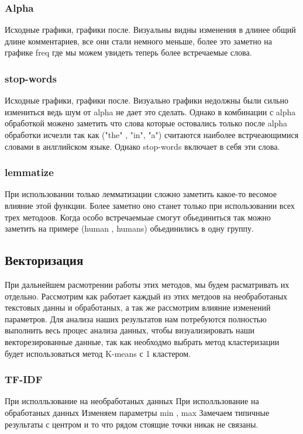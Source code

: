 		\subsubsection{Alpha}
			Исходные графики, графики после. Визуальны видны изменения в длинее общий длине комментариев, все они стали немного меньше, более это заметно на графике freq где мы можем увидеть теперь более встречаемые слова. 
				
				
		\subsubsection{stop-words}
			Исходные графики, графики после. Визуально графики недолжны были сильно измениться ведь шум от alpha не дает это сделать. Однако в комбинации с alpha обработкой можено заметить что слова которые остовались только после alpha обработки исчезли так как ("the" , "in", "a") считаются наиболее встрчеающимися словами в анлглийском языке. Однако stop-words включает в себя эти слова.
			
		\subsubsection{lemmatize}
			При использовании только лемматизации сложно заметить какое-то весомое влияние этой функции.
			Более заметно оно станет только при использовании всех трех методоов. Когда особо встречаемыае смогут обьединиться так можно заметить на примере (human , humans) обьединились в одну группу.
			
	\subsection{Векторизация}
		При дальнейшем расмотрении работы этих методов, мы будем расматривать их отдельно. Рассмотрим как работает каждый из этих метдоов на необработаных текстовых данны и обработаных, а так же рассмотрим влияние изменений параметров. Для анализа наших результатов нам потребуются полностью выполнить весь процес анализа данных, чтобы визуализировать наши векторезированные данные, так как необходмо выбрать метод кластеризации будет использоваться метод K-means с 1 кластером.
	
		\subsubsection{TF-IDF}
			При исполльзование на необработаных данных
			При исполльзование на обработаных данных
			Изменяем параметры min , max
			Замечаем типичные результаты с центром и то что рядом стоящие точки никак не связаны.
			
